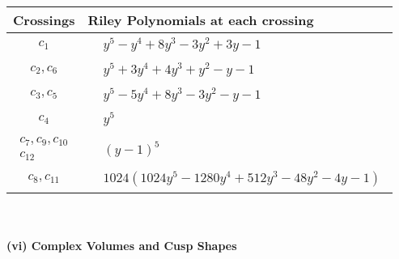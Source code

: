 \documentclass[1p]{elsarticle_modified}
\theoremstyle{definition}
\begin{document}
\begin{tabular}{m{50pt}|m{274pt}}
Crossings & \hspace{64pt}Riley Polynomials at each crossing \\
\hline $$\begin{aligned}c_{1}\end{aligned}$$&$\begin{aligned}
&y^5- y^4+8 y^3-3 y^2+3 y-1
\end{aligned}$\\
\hline $$\begin{aligned}c_{2},c_{6}\end{aligned}$$&$\begin{aligned}
&y^5+3 y^4+4 y^3+y^2- y-1
\end{aligned}$\\
\hline $$\begin{aligned}c_{3},c_{5}\end{aligned}$$&$\begin{aligned}
&y^5-5 y^4+8 y^3-3 y^2- y-1
\end{aligned}$\\
\hline $$\begin{aligned}c_{4}\end{aligned}$$&$\begin{aligned}
&y^5
\end{aligned}$\\
\hline $$\begin{aligned}c_{7},c_{9},c_{10}\\c_{12}\end{aligned}$$&$\begin{aligned}
&(y-1)^5
\end{aligned}$\\
\hline $$\begin{aligned}c_{8},c_{11}\end{aligned}$$&$\begin{aligned}
&1024(1024 y^5-1280 y^4+512 y^3-48 y^2-4 y-1)
\end{aligned}$\\
\hline
\end{tabular}\\~\\
\newpage\flushleft \textbf{(vi) Complex Volumes and Cusp Shapes}
\end{document}
